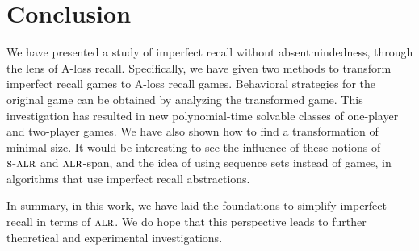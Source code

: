 

\section{Conclusion}

We have presented a study of imperfect recall without
absentmindedness, through the lens of A-loss recall. Specifically, we
have given two methods to transform imperfect recall games to A-loss
recall games. Behavioral strategies for the original game can be
obtained by analyzing the transformed game. This investigation has
resulted in new polynomial-time solvable classes of one-player and
two-player games. We have also shown how to find a transformation
of minimal size. It would be interesting to see the influence of these
notions of $\textsc{s-alr}$ and $\textsc{alr}$-span, and the idea of using sequence
sets instead of games, in algorithms that use imperfect recall
abstractions.

In summary, in this work, we have laid the foundations to simplify imperfect
recall in terms of $\textsc{alr}$. We do hope that this perspective leads to
further theoretical and experimental investigations.  


